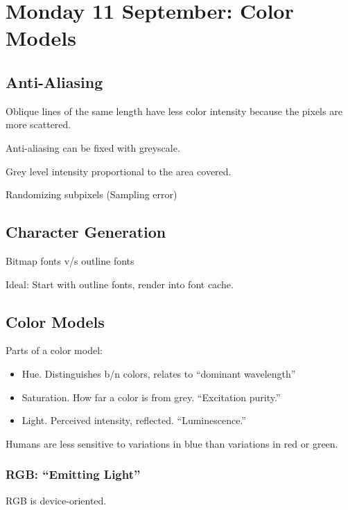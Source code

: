 \section{Monday 11 September:  Color Models}

\subsection{Anti-Aliasing}

Oblique lines of the same length have less color intensity because the pixels are more scattered.  

Anti-aliasing can be fixed with greyscale.

Grey level intensity proportional to the area covered.  

Randomizing subpixels (Sampling error)

\subsection{Character Generation}

Bitmap fonts v/s outline fonts

Ideal:  Start with outline fonts, render into font cache.  

\subsection{Color Models}

Parts of a color model:

\begin{itemize}
	\item Hue.  Distinguishes b/n colors, relates to ``dominant wavelength''
	\item Saturation.  How far a color is from grey.  ``Excitation purity.''
	\item Light.  Perceived intensity, reflected.  ``Luminescence.''
\end{itemize}

Humans are less sensitive to variations in blue than variations in red or green.  

\subsubsection{RGB:  ``Emitting Light''}

RGB is device-oriented.  

\


